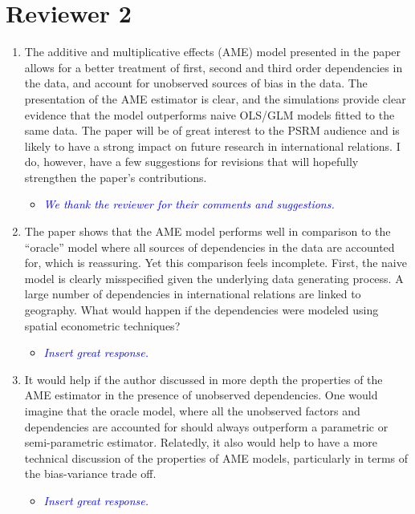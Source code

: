 \section*{Reviewer 2}

\begin{enumerate}
	\item The additive and multiplicative effects (AME) model presented in the paper allows for a better treatment of first, second and third order dependencies in the data, and account for unobserved sources of bias in the data. The presentation of the AME estimator is clear, and the simulations provide clear evidence that the model outperforms naive OLS/GLM models fitted to the same data. The paper will be of great interest to the PSRM audience and is likely to have a strong impact on future research in international relations. I do, however, have a few suggestions for revisions that will hopefully strengthen the paper’s contributions.
	\begin{itemize}
		\item \textcolor{blue}{ \emph{
		We thank the reviewer for their comments and suggestions.
		}}
	\end{itemize}
	\item The paper shows that the AME model performs well in comparison to the “oracle” model where all sources of dependencies in the data are accounted for, which is reassuring. Yet this comparison feels incomplete. First, the naive model is clearly misspecified given the underlying data generating process. A large number of dependencies in international relations are linked to geography. What would happen if the dependencies were modeled using spatial econometric techniques?
	\begin{itemize}
		\item \textcolor{blue}{ \emph{
		Insert great response.
		}}
	\end{itemize}
	\item It would help if the author discussed in more depth the properties of the AME estimator in the presence of unobserved dependencies. One would imagine that the oracle model, where all the unobserved factors and dependencies are accounted for should always outperform a parametric or semi-parametric estimator. Relatedly, it also would help to have a more technical discussion of the properties of AME models, particularly in terms of the bias-variance trade off.
	\begin{itemize}
		\item \textcolor{blue}{ \emph{
		Insert great response.
}}
\end{itemize}
\end{enumerate}
